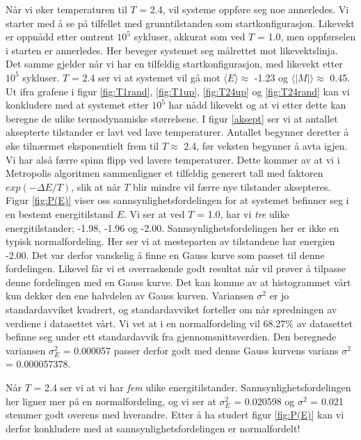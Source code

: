 \documentclass[11pt,a4paper]{article}
\begin{document}
Når vi øker temperaturen til $T$ = 2.4, vil systeme oppføre seg noe annerledes. Vi starter med å se på tilfellet med grunntilstanden som startkonfigurasjon. Likevekt er oppnådd etter omtrent $10^5$ sykluser, akkurat som ved $T$ = 1.0, men oppførselen i starten er annerledes. Her beveger systemet seg målrettet mot likevektslinja. Det samme gjelder når vi har en tilfeldig startkonfigurasjon, med likevekt etter $10^5$ sykluser. $T$ = 2.4 ser vi at systemet vil gå mot $\langle E \rangle \approx$ -1.23 og $\langle |M| \rangle \approx $ 0.45. \\

Ut ifra grafene i figur \ref{fig:T1rand}, \ref{fig:T1up}, \ref{fig:T24up} og \ref{fig:T24rand} kan vi konkludere med at systemet etter $10^5$ har nådd likevekt og at vi etter dette kan beregne de ulike termodynamiske størrelsene. I figur \ref{aksept} ser vi at antallet aksepterte tilstander er lavt ved lave temperaturer. Antallet begynner deretter å øke tilnærmet eksponentielt frem til $T \approx $ 2.4, før veksten begynner å avta igjen. Vi har alså færre spinn flipp ved lavere temperaturer. Dette kommer av at vi i Metropolis algoritmen sammenligner et tilfeldig generert tall med faktoren $exp(-\Delta E/T)$, slik at når $T$ blir mindre vil færre nye tilstander aksepteres.\\

Figur \ref{fig:P(E)} viser oss sannsynlighetsfordelingen for at systemet befinner seg i en bestemt energitilstand $E$. Vi ser at ved $T$ = 1.0, har vi \textit{tre} ulike energitilstander; -1.98, -1.96 og -2.00. Sannsynlighetsfordelingen her er ikke en typisk normalfordeling. Her ser vi at mesteparten av tilstandene har energien -2.00. Det var derfor vanskelig å finne en Gauss kurve som passet til denne fordelingen. Likevel får vi et overraskende godt resultat når vil prøver å tilpasse denne fordelingen med en Gauss kurve. Det kan komme av at histogrammet vårt kun dekker den ene halvdelen av Gauss kurven. Variansen $\sigma^2$ er jo standardavviket kvadrert, og standardavviket forteller om når spredningen av verdiene i datasettet vårt. Vi vet at i en normalfordeling vil 68.27$\%$ av datasettet befinne seg under ett standardavvik fra gjennomsnittsverdien. Den beregnede variansen $\sigma_E^2$ = 0.000057 passer derfor godt med denne Gauss kurvens varians $\sigma^2$ = 0.000057378. 

Når $T$ = 2.4 ser vi at vi har \textit{fem} ulike energitilstander. Sannsynlighetsfordelingen her ligner mer på en normalfordeling, og vi ser at $\sigma_E^2$ = 0.020598 og $\sigma^2$ = 0.021 stemmer godt overens med hverandre. Etter å ha studert figur \ref{fig:P(E)} kan vi derfor konkludere med at sannsynlighetsfordelingen er normalfordelt!\\
\end{document}
